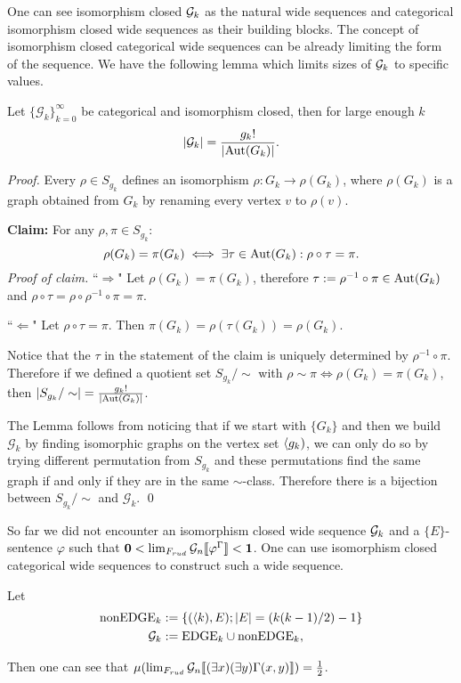 One can see isomorphism closed $\mathcal{G}_k$ as the natural wide sequences and categorical isomorphism closed wide sequences as their building blocks. The concept of isomorphism closed categorical wide sequences can be already limiting the form of the sequence. We have the following lemma which limits sizes of $\mathcal{G}_k$ to specific values.

\begin{lemm}
Let $\{\mathcal{G}_k\}_{k=0}^\infty$ be categorical and isomorphism closed, then for large enough $k$
\[\left|{\mathcal{G}_k}\right|=\frac{g_k!}{\left|{\text{Aut}(G_k)}\right|}.\]
\end{lemm}
\begin{proof}
Every $\rho\in S_{g_k}$ defines an isomorphism $\rho:G_k\to\rho(G_k)$, where $\rho(G_k)$ is a graph obtained from $G_k$ by renaming every vertex $v$ to $\rho(v)$.

{}
\textbf{Claim:} For any $\rho,\pi\in S_{g_k}$:
\[\rho(G_k)=\pi(G_k)\iff\exists \tau\in\text{Aut}(G_k):\rho\circ\tau=\pi.\]
\textit{Proof of claim.} ``$\Rightarrow$" Let $\rho(G_k)=\pi(G_k)$, therefore $\tau:=\rho^{-1}\circ\pi\in\text{Aut}(G_k)$ and $\rho\circ\tau=\rho\circ\rho^{-1}\circ\pi=\pi.$

``$\Leftarrow$" Let $\rho\circ\tau=\pi$. Then $\pi(G_k)=\rho(\tau(G_k))=\rho(G_k).$ \qedhere

Notice that the $\tau$ in the statement of the claim is uniquely determined by $\rho^{-1}\circ\pi$. Therefore if we defined a quotient set $S_{g_k}/\sim$ with $\rho\sim\pi\iff\rho(G_k)=\pi(G_k)$, then $\left|{S_{g_k}/\sim}\right|=\frac{g_k!}{\left|{\text{Aut}(G_k)}\right|}$.

The Lemma follows from noticing that if we start with $\{G_k\}$ and then we build $\mathcal{G}_k$ by finding isomorphic graphs on the vertex set $\langle g_k)$, we can only do so by trying different permutation from $S_{g_k}$ and these permutations find the same graph if and only if they are in the same $\sim$-class. Therefore there is a bijection between $S_{g_k}/\sim$ and $\mathcal{G}_k$. \qed
\end{proof}

So far we did not encounter an isomorphism closed wide sequence $\mathcal{G}_k$ and a $\{E\}$-sentence $\varphi$ such that $\textbf{0}<\lim_{F_{rud}}\mathcal{G}_n\llbracket\varphi^\Gamma\rrbracket<\textbf{1}$. One can use isomorphism closed categorical wide sequences to construct such a wide sequence.
\begin{exam}
Let
\begin{align}
\text{nonEDGE}_k&:=\{(\langle k),E);\left|{E}\right|=(k(k-1)/2)-1\}\\
\mathcal{G}_k&:=\text{EDGE}_k\cup\text{nonEDGE}_k,
\end{align}

Then one can see that $\mu(\lim_{F_{rud}}\mathcal{G}_n\llbracket(\exists x)(\exists y)\Gamma(x,y)\rrbracket)=\frac{1}{2}$.
\end{exam}


